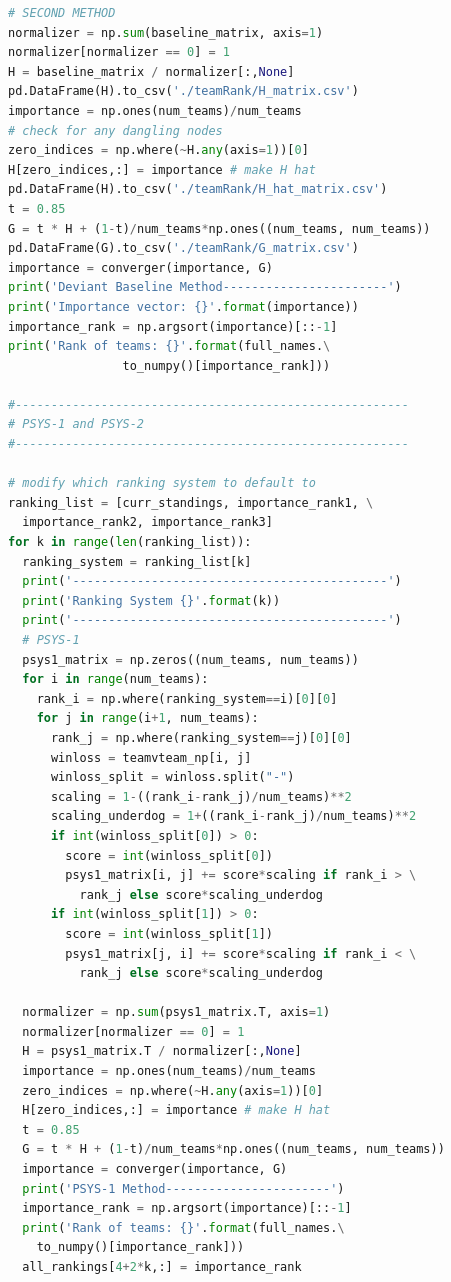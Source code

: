 \documentclass[12pt]{article}%
\begin{document}
\begin{lstlisting}[language=Python]
# SECOND METHOD
normalizer = np.sum(baseline_matrix, axis=1)
normalizer[normalizer == 0] = 1
H = baseline_matrix / normalizer[:,None]
pd.DataFrame(H).to_csv('./teamRank/H_matrix.csv')
importance = np.ones(num_teams)/num_teams
# check for any dangling nodes
zero_indices = np.where(~H.any(axis=1))[0]
H[zero_indices,:] = importance # make H hat
pd.DataFrame(H).to_csv('./teamRank/H_hat_matrix.csv')
t = 0.85
G = t * H + (1-t)/num_teams*np.ones((num_teams, num_teams))
pd.DataFrame(G).to_csv('./teamRank/G_matrix.csv')
importance = converger(importance, G)
print('Deviant Baseline Method-----------------------')
print('Importance vector: {}'.format(importance))
importance_rank = np.argsort(importance)[::-1]
print('Rank of teams: {}'.format(full_names.\
				to_numpy()[importance_rank]))

#-------------------------------------------------------
# PSYS-1 and PSYS-2
#-------------------------------------------------------

# modify which ranking system to default to
ranking_list = [curr_standings, importance_rank1, \
  importance_rank2, importance_rank3]
for k in range(len(ranking_list)):
  ranking_system = ranking_list[k]
  print('--------------------------------------------')
  print('Ranking System {}'.format(k))
  print('--------------------------------------------')
  # PSYS-1
  psys1_matrix = np.zeros((num_teams, num_teams))
  for i in range(num_teams):
    rank_i = np.where(ranking_system==i)[0][0]
    for j in range(i+1, num_teams):
      rank_j = np.where(ranking_system==j)[0][0]
      winloss = teamvteam_np[i, j]
      winloss_split = winloss.split("-")
      scaling = 1-((rank_i-rank_j)/num_teams)**2
      scaling_underdog = 1+((rank_i-rank_j)/num_teams)**2
      if int(winloss_split[0]) > 0:
        score = int(winloss_split[0])
        psys1_matrix[i, j] += score*scaling if rank_i > \
          rank_j else score*scaling_underdog
      if int(winloss_split[1]) > 0:
        score = int(winloss_split[1])
        psys1_matrix[j, i] += score*scaling if rank_i < \
          rank_j else score*scaling_underdog

  normalizer = np.sum(psys1_matrix.T, axis=1)
  normalizer[normalizer == 0] = 1
  H = psys1_matrix.T / normalizer[:,None]
  importance = np.ones(num_teams)/num_teams
  zero_indices = np.where(~H.any(axis=1))[0] 
  H[zero_indices,:] = importance # make H hat
  t = 0.85
  G = t * H + (1-t)/num_teams*np.ones((num_teams, num_teams))
  importance = converger(importance, G)
  print('PSYS-1 Method-----------------------')
  importance_rank = np.argsort(importance)[::-1]
  print('Rank of teams: {}'.format(full_names.\
    to_numpy()[importance_rank]))
  all_rankings[4+2*k,:] = importance_rank



\end{lstlisting}
\end{document}
